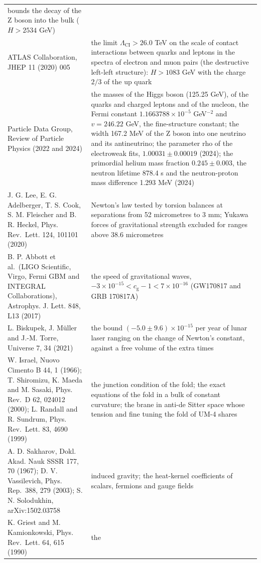 \documentclass[
  10pt,
]{article}
\begin{document}
\begin{longtable}[]{@{}
  >{\raggedright\arraybackslash}p{}
  >{\raggedright\arraybackslash}p{}@{}}
bounds the decay of the Z boson into the bulk (\(H > 2534\) GeV) \\
ATLAS Collaboration, JHEP 11 (2020) 005 & the limit
\(\Lambda_{\mathrm{CI}} > 26.0\) TeV on the scale of contact
interactions between quarks and leptons in the spectra of electron and
muon pairs (the destructive left-left structure): \(H > 1083\) GeV with
the charge \(2/3\) of the up quark \\
Particle Data Group, Review of Particle Physics (2022 and 2024) & the
masses of the Higgs boson (125.25 GeV), of the quarks and charged
leptons and of the nucleon, the Fermi constant
\(1.1663788\times10^{-5}\) GeV\(^{-2}\) and \(v = 246.22\) GeV, the
fine-structure constant; the width 167.2 MeV of the Z boson into one
neutrino and its antineutrino; the parameter rho of the electroweak
fits, \(1.00031 \pm 0.00019\) (2024); the primordial helium mass
fraction \(0.245 \pm 0.003\), the neutron lifetime 878.4 s and the
neutron-proton mass difference 1.293 MeV (2024) \\
J. G. Lee, E. G. Adelberger, T. S. Cook, S. M. Fleischer and B. R.
Heckel, Phys. Rev.~Lett. 124, 101101 (2020) & Newton's law tested by
torsion balances at separations from 52 micrometres to 3 mm; Yukawa
forces of gravitational strength excluded for ranges above 38.6
micrometres \\
B. P. Abbott et al.~(LIGO Scientific, Virgo, Fermi GBM and INTEGRAL
Collaborations), Astrophys. J. Lett. 848, L13 (2017) & the speed of
gravitational waves,
\(-3\times10^{-15} < c_{\mathrm{g}} - 1 < 7\times10^{-16}\) (GW170817
and GRB 170817A) \\
L. Biskupek, J. Müller and J.-M. Torre, Universe 7, 34 (2021) & the
bound \((-5.0 \pm 9.6)\times10^{-15}\) per year of lunar laser ranging
on the change of Newton's constant, against a free volume of the extra
times \\
W. Israel, Nuovo Cimento B 44, 1 (1966); T. Shiromizu, K. Maeda and M.
Sasaki, Phys. Rev.~D 62, 024012 (2000); L. Randall and R. Sundrum, Phys.
Rev.~Lett. 83, 4690 (1999) & the junction condition of the fold; the
exact equations of the fold in a bulk of constant curvature; the brane
in anti-de Sitter space whose tension and fine tuning the fold of UM-4
shares \\
A. D. Sakharov, Dokl. Akad. Nauk SSSR 177, 70 (1967); D. V. Vassilevich,
Phys. Rep.~388, 279 (2003); S. N. Solodukhin, arXiv:1502.03758 & induced
gravity; the heat-kernel coefficients of scalars, fermions and gauge
fields \\
K. Griest and M. Kamionkowski, Phys. Rev.~Lett. 64, 615 (1990) & the

\end{longtable}
\end{document}
